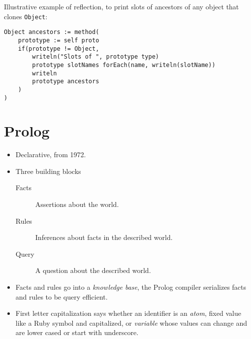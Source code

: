 \documentclass[10pt, twocolumn, landscape]{article}
\begin{document}
Illustrative example of reflection, to print slots of ancestors of any object
that clones \texttt{Object}:
\begin{lstlisting}
Object ancestors := method(
    prototype := self proto
    if(prototype != Object,
        writeln("Slots of ", prototype type)
        prototype slotNames forEach(name, writeln(slotName))
        writeln
        prototype ancestors
    )
)
\end{lstlisting}

\section{Prolog}

\begin{itemize}
    \item Declarative, from 1972.
    \item Three building blocks
        \begin{description}
            \item[Facts] Assertions about the world.
            \item[Rules] Inferences about facts in the described world.
            \item[Query] A question about the described world.
        \end{description}
    \item Facts and rules go into a \emph{knowledge base}, the Prolog compiler
        serializes facts and rules to be query efficient.
    \item First letter capitalization says whether an identifier is an
        \emph{atom}, fixed value like a Ruby symbol and capitalized, or
        \emph{variable} whose values can change and are lower cased or start
        with underscore.
\end{itemize}
\end{document}
